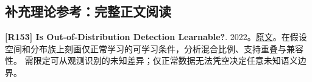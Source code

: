 \documentclass[11pt,a4paper]{article}
\begin{document}
\subsection*{补充理论参考：完整正文阅读}
\hypertarget{R153}{}\textbf{[R153] Is Out-of-Distribution Detection Learnable?}. 2022。\href{https://arxiv.org/pdf/2210.14707}{原文}。在假设空间和分布族上刻画仅正常学习的可学习条件，分析混合比例、支持重叠与兼容性。 需限定可从观测识别的未知差异；仅正常数据无法凭空决定任意未知语义边界。
\end{document}
